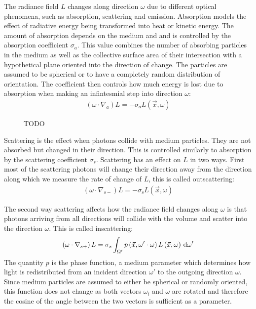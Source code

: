 The radiance field $L$ changes along direction $\omega$ due to different optical phenomena, such as absorption, scattering and emission. Absorption models the effect of radiative energy being transformed into heat or kinetic energy. The amount of absorption depends on the medium and and is controlled by the absorption coefficient $\sigma_a$. This value combines the number of absorbing particles in the medium as well as the collective surface area of their intersection with a hypothetical plane oriented into the direction of change. The particles are assumed to be spherical or to have a completely random distribution of orientation. The coefficient then controls how much energy is lost due to absorption when making an infintesmial step into direction $\omega$:
\begin{align}
\left(\omega\cdot\nabla_{a}\right)L = -\sigma_a L\left(\vec{x}, \omega \right)
\end{align}

\begin{figure}[t]
\centering
{}
\caption{TODO}
\label{fig:rte_change_L_all}
\end{figure}


Scattering is the effect when photons collide with medium particles. They are not absorbed but changed in their direction. This is controlled similarly to absorption by the scattering coefficient $\sigma_s$. Scattering has an effect on $L$ in two ways. First most of the scattering photons will change their direction away from the direction along which we measure the rate of change of $L$, this is called outscattering:
\begin{align}
\left(\omega\cdot\nabla_{s-}\right)L = -\sigma_s L\left(\vec{x}, \omega \right)
\end{align}

The second way scattering affects how the radiance field changes along $\omega$ is that photons arriving from all directions will collide with the volume and scatter into the direction $\omega$. This is called inscattering:
\begin{align}
\left(\omega\cdot\nabla_{s+}\right)L = \sigma_s \int_{\Omega'}p\left(\vec{x}, \omega'\cdot\omega\right)L\left(\vec{x}, \omega \right)\,\mathrm{d}\omega'
\end{align}
The quantity $p$ is the phase function, a medium parameter which determines how light is redistributed from an incident direction $\omega'$ to the outgoing direction $\omega$. Since medium particles are assumed to either be spherical or randomly oriented, this function does not change as both vectors $\omega_i$ and $\omega$ are rotated and therefore the cosine of the angle between the two vectors is sufficient as a parameter.

